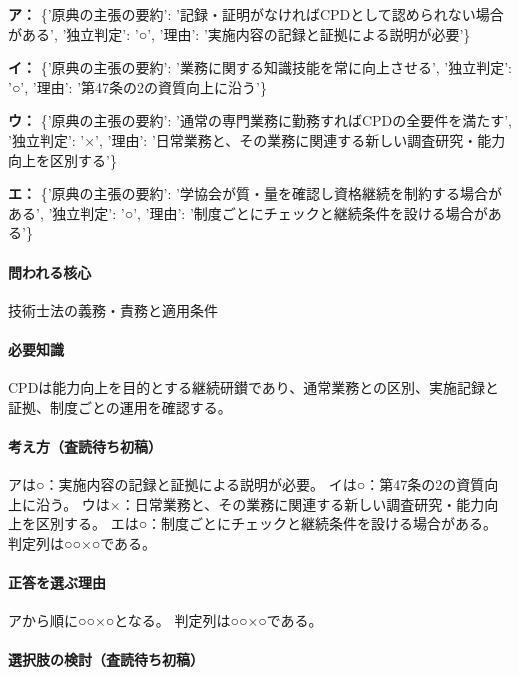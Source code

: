 \noindent\textbf{ア：} \{'原典の主張の要約': '記録・証明がなければCPDとして認められない場合がある', '独立判定': '○', '理由': '実施内容の記録と証拠による説明が必要'\}\par

\noindent\textbf{イ：} \{'原典の主張の要約': '業務に関する知識技能を常に向上させる', '独立判定': '○', '理由': '第47条の2の資質向上に沿う'\}\par

\noindent\textbf{ウ：} \{'原典の主張の要約': '通常の専門業務に勤務すればCPDの全要件を満たす', '独立判定': '×', '理由': '日常業務と、その業務に関連する新しい調査研究・能力向上を区別する'\}\par

\noindent\textbf{エ：} \{'原典の主張の要約': '学協会が質・量を確認し資格継続を制約する場合がある', '独立判定': '○', '理由': '制度ごとにチェックと継続条件を設ける場合がある'\}\par

\paragraph{問われる核心} 技術士法の義務・責務と適用条件

\paragraph{必要知識} CPDは能力向上を目的とする継続研鑚であり、通常業務との区別、実施記録と証拠、制度ごとの運用を確認する。

\paragraph{考え方（査読待ち初稿）} アは○：実施内容の記録と証拠による説明が必要。 イは○：第47条の2の資質向上に沿う。 ウは×：日常業務と、その業務に関連する新しい調査研究・能力向上を区別する。 エは○：制度ごとにチェックと継続条件を設ける場合がある。 判定列は○○×○である。

\paragraph{正答を選ぶ理由} アから順に○○×○となる。  判定列は○○×○である。

\paragraph{選択肢の検討（査読待ち初稿）}\mbox{}\par

